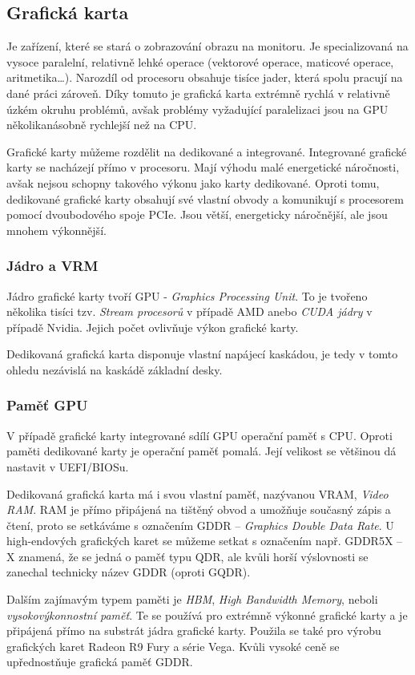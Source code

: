 \documentclass[a4paper]{article}
\begin{document}
    \subsection{Grafická karta}
        Je zařízení, které se stará o zobrazování obrazu na monitoru. Je specializovaná na vysoce paralelní, relativně lehké operace (vektorové operace, maticové operace, aritmetika\dots). Narozdíl od procesoru obsahuje tisíce jader, která spolu pracují na dané práci zároveň. Díky tomuto je grafická karta extrémně rychlá v relativně úzkém okruhu problémů, avšak problémy vyžadující paralelizaci jsou na GPU několikanásobně rychlejší než na CPU. \par
        Grafické karty můžeme rozdělit na dedikované a integrované. Integrované grafické karty se nacházejí přímo v procesoru. Mají výhodu malé energetické náročnosti, avšak nejsou schopny takového výkonu jako karty dedikované. Oproti tomu, dedikované grafické karty obsahují své vlastní obvody a komunikují s procesorem pomocí dvoubodového spoje PCIe. Jsou větší, energeticky náročnější, ale jsou mnohem výkonnější.
        \subsubsection{Jádro a VRM}
            Jádro grafické karty tvoří GPU - \textit{Graphics Processing Unit}. To je tvořeno několika tisíci tzv. \textit{Stream procesorů} v případě AMD anebo \textit{CUDA jádry} v případě Nvidia. Jejich počet ovlivňuje výkon grafické karty. \par
            Dedikovaná grafická karta disponuje vlastní napájecí kaskádou, je tedy v tomto ohledu nezávislá na kaskádě základní desky.
        \subsubsection{Paměť GPU}
            V případě grafické karty integrované sdílí GPU operační paměť s CPU. Oproti paměti dedikované karty je operační paměť pomalá. Její velikost se většinou dá nastavit v UEFI/BIOSu. \par
            Dedikovaná grafická karta má i svou vlastní paměť, nazývanou VRAM, \textit{Video RAM}. RAM je přímo připájená na tištěný obvod a umožňuje současný zápis a čtení, proto se setkáváme s označením GDDR -- \textit{Graphics Double Data Rate}. U high-endových grafických karet se můžeme setkat s označením např. GDDR5X -- X znamená, že se jedná o paměť typu QDR, ale kvůli horší výslovnosti se zanechal technicky  název GDDR (oproti GQDR). \par
            Dalším zajímavým typem paměti je \textit{HBM}, \textit{High Bandwidth Memory}, neboli \textit{vysokovýkonnostní paměť}. Te se používá pro extrémně výkonné grafické karty a je připájená přímo na substrát jádra grafické karty. Použila se také pro výrobu grafických karet Radeon R9 Fury a série Vega. Kvůli vysoké ceně se upřednostňuje grafická paměť GDDR.
\end{document}
